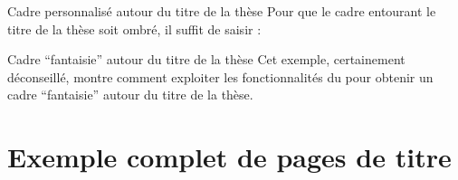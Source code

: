 \begin{dbexample}{Cadre personnalisé autour du titre de la thèse}{}
  Pour que le cadre entourant le titre de la thèse soit ombré, il suffit de
  saisir :
\begin{preamblecode}[]
\maketitle[frametitle=shadowbox]
\end{preamblecode}
\end{dbexample}

\begin{dbexample}{Cadre \enquote{fantaisie} autour du titre de la thèse}{}
  Cet exemple, certainement déconseillé, montre comment exploiter les
  fonctionnalités du  pour obtenir un cadre
  \enquote{fantaisie} autour du titre de la thèse.%
  \NoAutoSpacing%
\begin{preamblecode}[]
\maketitle[frametitle={colback=red!50!white,beamer}]
\end{preamblecode}
\end{dbexample}

\section{Exemple complet de pages de titre}
\label{sec-exemple-complet}

